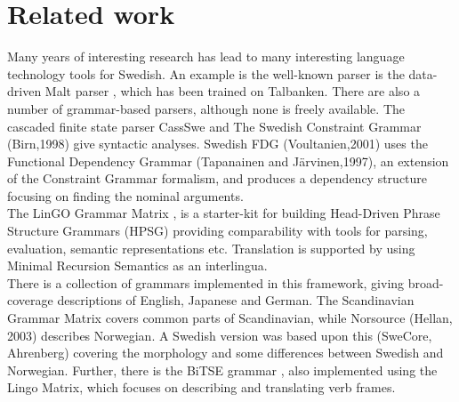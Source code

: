 \documentclass{report}
\begin{document}
\section{Related work}
\label{sec:related}
Many years of interesting research has lead to many interesting language
technology tools for Swedish.
An example is the well-known parser is the data-driven Malt parser \cite{malt},
which has been trained on Talbanken. 
There are also a number of grammar-based parsers, although none is freely available.
The cascaded finite state parser CassSwe \cite{casswe} and
The Swedish Constraint Grammar (Birn,1998) 
give syntactic analyses. %
Swedish FDG (Voultanien,2001) uses the Functional Dependency Grammar
(Tapanainen and Järvinen,1997), an extension of the Constraint Grammar
formalism, and produces a dependency structure focusing on finding the nominal
arguments. \\


The LinGO Grammar Matrix \cite{matrix}, is a starter-kit for building Head-Driven Phrase
Structure Grammars \cite{hpsg} (HPSG) providing comparability with tools for
parsing, evaluation, semantic representations etc.
Translation is supported by using Minimal Recursion
Semantics \cite{mrs} as an interlingua. \\
There is a collection of grammars implemented in this framework, giving broad-coverage
descriptions of %
English, Japanese and German. %
The Scandinavian Grammar Matrix \cite{scandmatrix} covers common parts of
Scandinavian, while Norsource (Hellan, 2003) describes Norwegian. A Swedish version
was based upon this (SweCore, Ahrenberg) covering the morphology and some
differences between Swedish and Norwegian. Further, there is the BiTSE 
grammar \cite{stymne}, also implemented using the Lingo Matrix,
which focuses on describing and translating verb frames.\\ %

\end{document}
